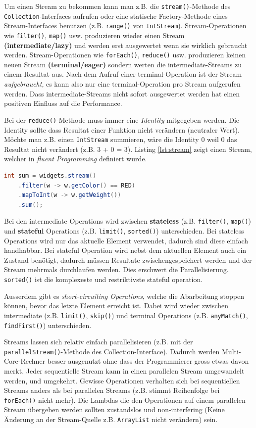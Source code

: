 Um einen Stream zu bekommen kann man z.B. die \verb|stream()|-Methode des \verb|Collection|-Interfaces aufrufen oder eine statische Factory-Methode eines Stream-Interfaces benutzen (z.B. \verb|range()| von \verb|IntStream|). Stream-Operationen wie \verb|filter()|, \verb|map()| usw. produzieren wieder einen Stream \textbf{(intermediate/lazy)} und werden erst ausgewertet wenn sie wirklich gebraucht werden. Stream-Operationen wie \verb|forEach()|, \verb|reduce()| usw. produzieren keinen neuen Stream \textbf{(terminal/eager)} sondern werten die intermediate-Streams zu einem Resultat aus. Nach dem Aufruf einer terminal-Operation ist der Stream \textit{aufgebraucht}, es kann also nur eine terminal-Operation pro Stream aufgerufen werden. Dass intermediate-Streams nicht sofort ausgewertet werden hat einen positiven Einfluss auf die Performance. 

Bei der \verb|reduce()|-Methode muss immer eine \textit{Identity} mitgegeben werden. Die Identity sollte dass Resultat einer Funktion nicht verändern (neutraler Wert). Möchte man z.B. einen \verb|IntStream| summieren, wäre die Identity 0 weil 0 das Resultat nicht verändert (z.B. 3 + 0 = 3). Listing \ref{lst:stream} zeigt einen Stream, welcher in \textit{fluent Programming} definiert wurde.

\begin{lstlisting}[language=Java, caption=Stream, label=lst:stream]
int sum = widgets.stream()
	.filter(w -> w.getColor() == RED)
	.mapToInt(w -> w.getWeight())
	.sum();
\end{lstlisting}

Bei den intermediate Operations wird zwischen \textbf{stateless} (z.B. \verb|filter()|, \verb|map()|) und \textbf{stateful} Operations (z.B. \verb|limit()|, \verb|sorted()|) unterschieden. Bei stateless Operations wird nur das aktuelle Element verwendet, dadurch sind diese einfach handhabbar. Bei stateful Operation wird nebst dem aktuellen Element auch ein Zustand benötigt, dadurch müssen Resultate zwischengespeichert werden und der Stream mehrmals durchlaufen werden. Dies erschwert die Parallelisierung. \verb|sorted()| ist die komplexeste und restriktivste stateful operation. 

Ausserdem gibt es \textit{short-circuiting Operations}, welche die Abarbeitung stoppen können, bevor das letzte Element erreicht ist. Dabei wird wieder zwischen intermediate (z.B. \verb|limit()|, \verb|skip()|) und terminal Operations (z.B. \verb|anyMatch()|, \verb|findFirst()|) unterschieden.

Streams lassen sich relativ einfach parallelisieren (z.B. mit der \verb|parallelStream()|-Methode des Collection-Interface). Dadurch werden Multi-Core-Rechner besser ausgenutzt ohne dass der Programmierer gross etwas davon merkt. Jeder sequentielle Stream kann in einen parallelen Stream umgewandelt werden, und umgekehrt. Gewisse Operationen verhalten sich bei sequentiellen Streams anders als bei parallelen Streams (z.B. stimmt Reihenfolge bei \verb|forEach()| nicht mehr). Die Lambdas die den Operationen auf einem parallelen Stream übergeben werden sollten zustandslos und non-interfering (Keine Änderung an der Stream-Quelle z.B. \verb|ArrayList| nicht verändern) sein.


